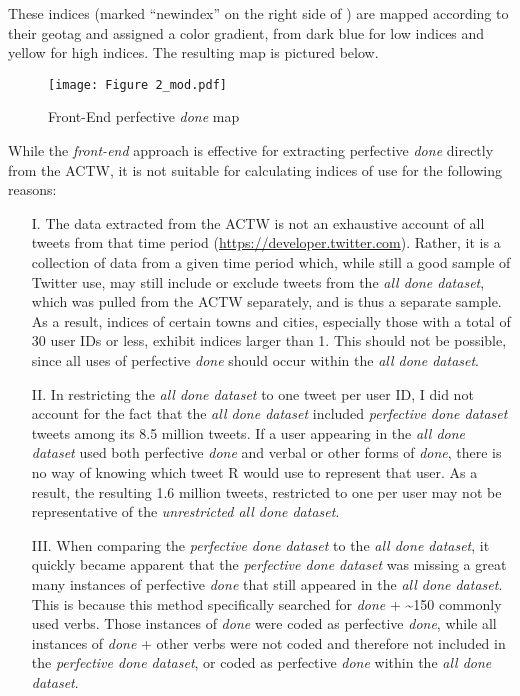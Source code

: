 \documentclass[output=paper,draftmode,colorlinks,citecolor=brown]{langscibook}
\begin{document}
These indices (marked “newindex” on the right side of ) are mapped according to their geotag and assigned a color gradient, from dark blue for low indices and yellow for high indices. The resulting map is pictured below.

\begin{figure}
\texttt{[image: Figure 2\_mod.pdf]}
\caption{Front-End perfective \textit{done} map}
\label{fig:baxter:2}
\end{figure}

While the \textit{front-end} approach is effective for extracting perfective \textit{done} directly from the ACTW, it is not suitable for calculating indices of use for the following reasons:

\begin{itemize}
\item[I.]  The data extracted from the ACTW is not an exhaustive account of all tweets from that time period (\url{https://developer.twitter.com}). Rather, it is a collection of data from a given time period which, while still a good sample of Twitter use, may still include or exclude tweets from the \textit{all done dataset}, which was pulled from the ACTW separately, and is thus a separate sample. As a result, indices of certain towns and cities, especially those with a total of 30 user IDs or less, exhibit indices larger than 1. This should not be possible, since all uses of perfective \textit{done} should occur within the \textit{all done dataset}.

\item[II.]  In restricting the \textit{all done dataset} to one tweet per user ID, I did not account for the fact that the \textit{all done dataset} included \textit{perfective done dataset} tweets among its 8.5 million tweets.  If a user appearing in the \textit{all done dataset} used both perfective \textit{done} and verbal or other forms of \textit{done}, there is no way of knowing which tweet R would use to represent that user. As a result, the resulting 1.6 million tweets, restricted to one per user may not be representative of the \textit{unrestricted all done dataset}.

\item[III.]\sloppy  When comparing the \textit{perfective done dataset} to the \textit{all done dataset}, it quickly became apparent that the \textit{perfective done dataset} was missing a great many instances of perfective \textit{done} that still appeared in the \textit{all done dataset}.  This is because this method specifically searched for \textit{done} + {\textasciitilde}150 commonly used verbs. Those instances of \textit{done} were coded as perfective \textit{done}, while all instances of \textit{done} + other verbs were not coded and therefore not included in the \textit{perfective done dataset}, or coded as perfective \textit{done} within the \textit{all done dataset}.
\end{itemize}
\end{document}
